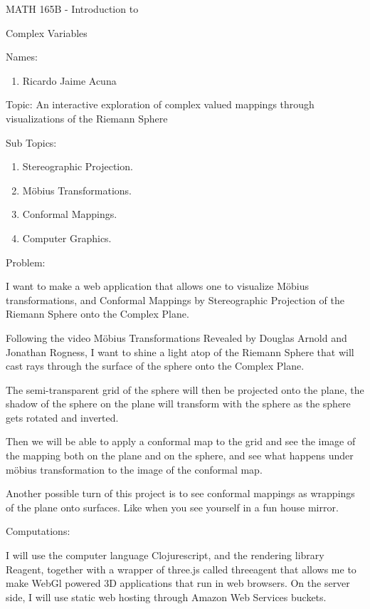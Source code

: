 \documentclass{article}
\begin{document}
\begin{center}
  MATH 165B - Introduction to

  Complex Variables
\end{center}\vspace{1.618em}

Names:
\begin{enumerate}
\item Ricardo Jaime Acuna
  \end{enumerate}
Topic: An interactive exploration of complex valued mappings through
visualizations of the Riemann Sphere

Sub Topics:
\begin{enumerate}
  \item Stereographic Projection.
  \item M\"obius Transformations.
  \item Conformal Mappings.
  \item Computer Graphics.
\end{enumerate}

Problem:

I want to make a web application that allows one to visualize M\"obius
transformations, and Conformal Mappings by Stereographic Projection
of the Riemann Sphere onto the Complex Plane.

Following the video Möbius Transformations Revealed  by Douglas Arnold
and Jonathan Rogness, I want to shine a light atop of the Riemann
Sphere that will cast rays through the surface of the sphere onto the
Complex Plane.

The semi-transparent grid of the sphere will then be
projected onto the plane, the shadow of the sphere on the plane will
transform
with the sphere as the sphere gets rotated and inverted.

Then we
will be able to apply a conformal map to the grid and see the image of
the mapping both on the plane and on the sphere, and see what happens
under m\"obius transformation to the image of the conformal map.

Another possible turn of this project is to see conformal mappings as
wrappings of the plane onto surfaces. Like when you
see yourself in a fun house mirror.

Computations:

I will use the computer language Clojurescript, and the
rendering library Reagent, together with a wrapper of three.js called
threeagent that allows me to make WebGl powered 3D applications that
run in web browsers. On the server side, I will use static web hosting through Amazon Web
Services buckets.
\end{document}
